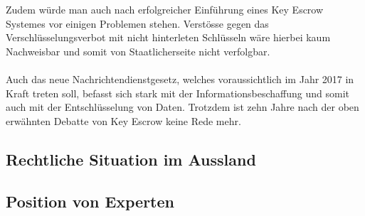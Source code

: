Zudem würde man auch nach erfolgreicher Einführung eines Key Escrow Systemes vor einigen Problemen stehen. Verstösse gegen das Verschlüsselungsverbot mit nicht hinterleten Schlüsseln wäre hierbei kaum Nachweisbar und somit von Staatlicherseite nicht verfolgbar. \cite{null} \\%
\\
Auch das neue Nachrichtendienstgesetz, welches voraussichtlich im Jahr 2017 in Kraft treten soll, befasst sich stark mit der Informationsbeschaffung und somit auch mit der Entschlüsselung von Daten. Trotzdem ist  zehn Jahre nach der oben erwähnten Debatte von Key Escrow keine Rede mehr. \cite{null} \\ %
		
	\subsection{Rechtliche Situation im Aussland}
	\subsection{Position von Experten}
